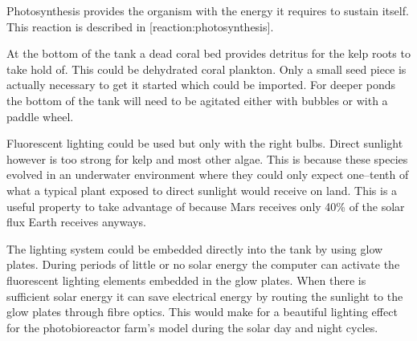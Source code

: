Photosynthesis provides the organism with the energy it requires to sustain itself. This reaction is described in [reaction:photosynthesis].

\startformula
{}
\stopformula

    {}

At the bottom of the tank a dead coral bed provides detritus for the kelp roots to take hold of. This could be dehydrated coral plankton. Only a small seed piece is actually necessary to get it started which could be imported. For deeper ponds the bottom of the tank will need to be agitated either with bubbles or with a paddle wheel.

Fluorescent lighting could be used but only with the right bulbs. Direct sunlight however is too strong for kelp and most other algae. This is because these species evolved in an underwater environment where they could only expect one--tenth of what a typical plant exposed to direct sunlight would receive on land. This is a useful property to take advantage of because Mars receives only 40\% of the solar flux Earth receives anyways. 

The lighting system could be embedded directly into the tank by using glow plates. During periods of little or no solar energy the computer can activate the fluorescent lighting elements embedded in the glow plates. When there is sufficient solar energy it can save electrical energy by routing the sunlight to the glow plates through fibre optics. This would make for a beautiful lighting effect for the photobioreactor farm's model during the solar day and night cycles.


